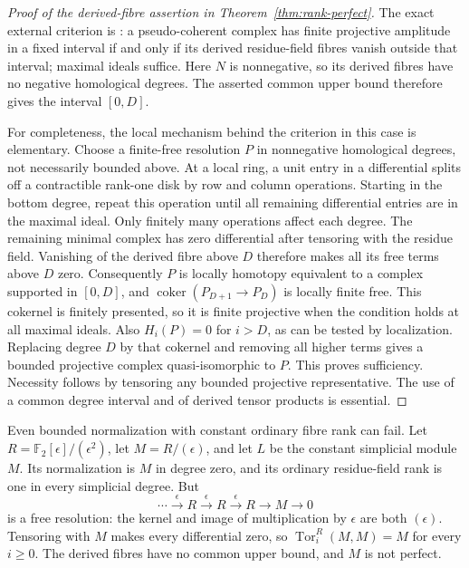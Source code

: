 \documentclass[11pt,a4paper]{article}
\theoremstyle{definition}
\newcommand{\F}{\mathbb F}
\begin{document}
\begin{proof}[Proof of the derived-fibre assertion in Theorem~\ref{thm:rank-perfect}]
The exact external criterion is
\cite[Lemma~15.79.2, Tag~068V]{StacksFibres}: a pseudo-coherent
complex has finite projective amplitude in a fixed interval if and
only if its derived residue-field fibres vanish outside that interval;
maximal ideals suffice. Here $N$ is nonnegative, so its derived
fibres have no negative homological degrees. The asserted common
upper bound therefore gives the interval $[0,D]$.

For completeness, the local mechanism behind the criterion in this
case is elementary. Choose a finite-free resolution $P$ in nonnegative
homological degrees, not necessarily bounded above. At a local ring,
a unit entry in a differential splits off a contractible rank-one
disk by row and column operations. Starting in the bottom degree,
repeat this operation until all remaining differential entries are
in the maximal ideal. Only finitely many operations affect each
degree. The remaining minimal complex has zero differential after
tensoring with the residue field. Vanishing of the derived fibre
above $D$ therefore makes all its free terms above $D$ zero.
Consequently $P$ is locally homotopy equivalent to a complex supported
in $[0,D]$, and
$\operatorname{coker}(P_{D+1}\to P_D)$ is locally finite free.
This cokernel is finitely presented, so it is finite projective
when the condition holds at all maximal ideals. Also $H_i(P)=0$
for $i>D$, as can be tested by localization. Replacing degree $D$
by that cokernel and removing all higher terms gives a bounded
projective complex quasi-isomorphic to $P$. This proves sufficiency.
Necessity follows by tensoring any bounded projective representative.
The use of a common degree interval and of derived tensor products is
essential.
\end{proof}

Even bounded normalization with constant ordinary fibre rank can fail.
Let $R=\F_2[\epsilon]/(\epsilon^2)$, let $M=R/(\epsilon)$, and let
$L$ be the constant simplicial module $M$. Its normalization is $M$
in degree zero, and its ordinary residue-field rank is one in every
simplicial degree. But
\[
 \cdots\xrightarrow{\epsilon}R\xrightarrow{\epsilon}R
 \xrightarrow{\epsilon}R\longrightarrow M\longrightarrow0
\]
is a free resolution: the kernel and image of multiplication by
$\epsilon$ are both $(\epsilon)$. Tensoring with $M$ makes every
differential zero, so
$\operatorname{Tor}^R_i(M,M)=M$ for every $i\ge0$. The derived
fibres have no common upper bound, and $M$ is not perfect.
\end{document}
